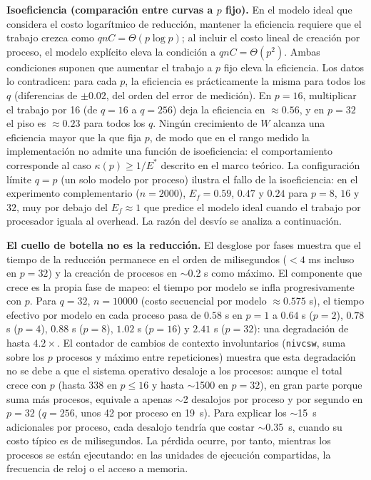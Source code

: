 \documentclass[11pt, a4paper]{article}
\begin{document}
\textbf{Isoeficiencia (comparación entre curvas a $p$ fijo).} En el modelo ideal que considera el costo logarítmico de reducción, mantener la eficiencia requiere que el trabajo crezca como $qnC=\Theta(p\log p)$; al incluir el costo lineal de creación por proceso, el modelo explícito eleva la condición a $qnC=\Theta(p^2)$. Ambas condiciones suponen que aumentar el trabajo a $p$ fijo eleva la eficiencia. Los datos lo contradicen: para cada $p$, la eficiencia es prácticamente la misma para todos los $q$ (diferencias de $\pm 0.02$, del orden del error de medición). En $p = 16$, multiplicar el trabajo por 16 (de $q = 16$ a $q = 256$) deja la eficiencia en $\approx 0.56$, y en $p = 32$ el piso es $\approx 0.23$ para todos los $q$. Ningún crecimiento de $W$ alcanza una eficiencia mayor que la que fija $p$, de modo que en el rango medido la implementación no admite una función de isoeficiencia: el comportamiento corresponde al caso $\kappa(p) \ge 1/E^{*}$ descrito en el marco teórico. La configuración límite $q = p$ (un solo modelo por proceso) ilustra el fallo de la isoeficiencia: en el experimento complementario ($n = 2000$), $E_f = 0.59$, $0.47$ y $0.24$ para $p = 8$, $16$ y $32$, muy por debajo del $E_f \approx 1$ que predice el modelo ideal cuando el trabajo por procesador iguala al overhead. La razón del desvío se analiza a continuación.

\textbf{El cuello de botella no es la reducción.} El desglose por fases muestra que el tiempo de la reducción permanece en el orden de milisegundos ($< 4$ ms incluso en $p = 32$) y la creación de procesos en $\sim$0.2 s como máximo. El componente que crece es la propia fase de mapeo: el tiempo por modelo se infla progresivamente con $p$. Para $q = 32$, $n = 10000$ (costo secuencial por modelo $\approx 0.575$ s), el tiempo efectivo por modelo en cada proceso pasa de $0.58$ s en $p = 1$ a $0.64$ s ($p=2$), $0.78$ s ($p=4$), $0.88$ s ($p=8$), $1.02$ s ($p=16$) y $2.41$ s ($p=32$): una degradación de hasta $4.2\times$. El contador de cambios de contexto involuntarios (\texttt{nivcsw}, suma sobre los $p$ procesos y máximo entre repeticiones) muestra que esta degradación no se debe a que el sistema operativo desaloje a los procesos: aunque el total crece con $p$ (hasta 338 en $p \le 16$ y hasta $\sim$1500 en $p = 32$), en gran parte porque suma más procesos, equivale a apenas $\sim$2 desalojos por proceso y por segundo en $p = 32$ ($q = 256$, unos 42 por proceso en 19~s). Para explicar los $\sim$15~s adicionales por proceso, cada desalojo tendría que costar $\sim$0.35~s, cuando su costo típico es de milisegundos. La pérdida ocurre, por tanto, mientras los procesos se están ejecutando: en las unidades de ejecución compartidas, la frecuencia de reloj o el acceso a memoria.
\end{document}
